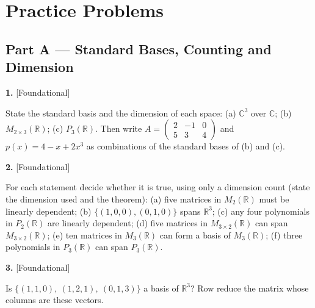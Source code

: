 \documentclass[11pt]{article}
\begin{document}
\section*{\large\color{ink} Practice Problems}
\subsection*{\normalsize\color{ink} Part A --- Standard Bases, Counting and Dimension}
\begin{minipage}{\linewidth}\textbf{1.} \hfill{\scriptsize\color{ink}[Foundational]}\par\nopagebreak State the standard basis and the dimension of each space: (a) $\mathbb{C}^{3}$ over $\mathbb{C}$; (b) $M_{2\times3}(\mathbb{R})$; (c) $P_{3}(\mathbb{R})$. Then write $A=\begin{pmatrix}2&-1&0\\5&3&4\end{pmatrix}$ and $p(x)=4-x+2x^{3}$ as combinations of the standard bases of (b) and (c).
\vspace{3.0cm}\end{minipage}\par\vspace{4pt}
\begin{minipage}{\linewidth}\textbf{2.} \hfill{\scriptsize\color{ink}[Foundational]}\par\nopagebreak For each statement decide whether it is true, using only a dimension count (state the dimension used and the theorem): (a) five matrices in $M_2(\mathbb{R})$ must be linearly dependent; (b) $\{(1,0,0),(0,1,0)\}$ spans $\mathbb{R}^{3}$; (c) any four polynomials in $P_2(\mathbb{R})$ are linearly dependent; (d) five matrices in $M_{3\times2}(\mathbb{R})$ can span $M_{3\times2}(\mathbb{R})$; (e) ten matrices in $M_3(\mathbb{R})$ can form a basis of $M_3(\mathbb{R})$; (f) three polynomials in $P_3(\mathbb{R})$ can span $P_3(\mathbb{R})$.
\vspace{4.1cm}\end{minipage}\par\vspace{4pt}
\begin{minipage}{\linewidth}\textbf{3.} \hfill{\scriptsize\color{ink}[Foundational]}\par\nopagebreak Is $\{(1,1,0),\ (1,2,1),\ (0,1,3)\}$ a basis of $\mathbb{R}^{3}$? Row reduce the matrix whose columns are these vectors.
\vspace{3.4cm}\end{minipage}\par\vspace{4pt}
\end{document}
